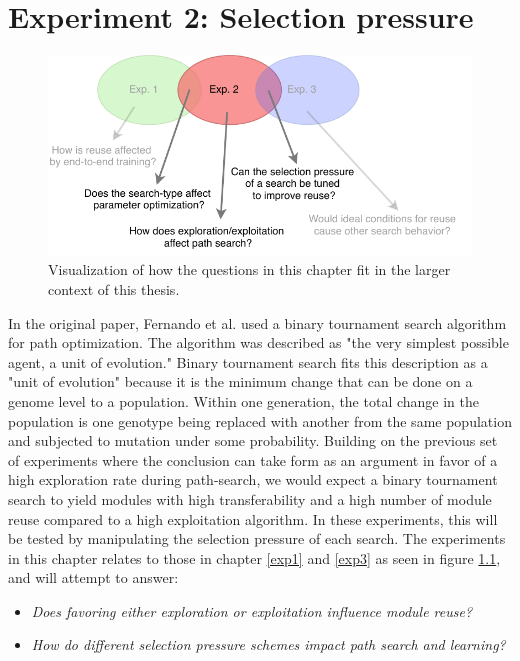 \chapter{Experiment 2: Selection pressure}
\label{exp2}

\begin{figure}[hb]
    \includegraphics[width=\textwidth]{Chapters/4.Experiments/exp2/figures/exp2.pdf}
    \caption[Experiment focus]{Visualization of how the questions in this chapter fit in the larger context of this thesis.}
    \label{fig:exp2.questions}
\end{figure}
\noindent
In the original paper, Fernando et al.\cite{pathnet} used a binary tournament search algorithm for path optimization. The algorithm was described as "the very simplest possible agent, a unit of evolution." Binary tournament search fits this description as a "unit of evolution" because it is the minimum change that can be done on a genome level to a population. Within one generation, the total change in the population is one genotype being replaced with another from the same population and subjected to mutation under some probability. Building on the previous set of experiments where the conclusion can take form as an argument in favor of a high exploration rate during path-search, we would expect a binary tournament search to yield modules with high transferability and a high number of module reuse compared to a high exploitation algorithm. In these experiments, this will be tested by manipulating the selection pressure of each search. The experiments in this chapter relates to those in chapter \ref{exp1} and \ref{exp3} as seen in figure \ref{fig:exp2.questions}, and will attempt to answer: 
\begin{itemize}
    \item \emph{Does favoring either exploration or exploitation influence module reuse?}
    \item \emph{How do different selection pressure schemes impact path search and learning?}
\end{itemize}


